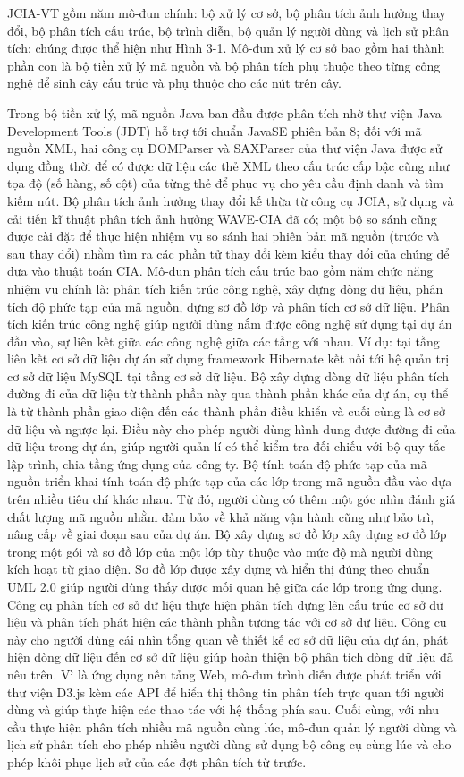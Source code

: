 \documentclass[12pt]{report}
\begin{document}
JCIA-VT gồm năm mô-đun chính: bộ xử lý cơ sở, bộ phân tích ảnh hưởng thay đổi, bộ phân tích cấu trúc, bộ trình diễn, bộ quản lý người dùng và lịch sử phân tích; chúng được thể hiện như Hình 3-1. Mô-đun xử lý cơ sở bao gồm hai thành phần con là bộ tiền xử lý mã nguồn và bộ phân tích phụ thuộc theo từng công nghệ để sinh cây cấu trúc và phụ thuộc cho các nút trên cây.

Trong bộ tiền xử lý, mã nguồn Java ban đầu được phân tích nhờ thư viện Java Development Tools (JDT)  hỗ trợ tới chuẩn JavaSE phiên bản 8; đối với mã nguồn XML, hai công cụ DOMParser và SAXParser của thư viện Java được sử dụng đồng thời để có được dữ liệu các thẻ XML theo cấu trúc cấp bậc cũng như tọa độ (số hàng, số cột) của từng thẻ để phục vụ cho yêu cầu định danh và tìm kiếm nút. Bộ phân tích ảnh hưởng thay đổi kế thừa từ công cụ JCIA, sử dụng và cải tiến kĩ thuật phân tích ảnh hưởng WAVE-CIA đã có; một bộ so sánh cũng được cài đặt để thực hiện nhiệm vụ so sánh hai phiên bản mã nguồn (trước và sau thay đổi) nhằm tìm ra các phần tử thay đổi kèm kiểu thay đổi của chúng để đưa vào thuật toán CIA. Mô-đun phân tích cấu trúc bao gồm năm chức năng nhiệm vụ chính là: phân tích kiến trúc công nghệ, xây dựng dòng dữ liệu, phân tích độ phức tạp của mã nguồn, dựng sơ đồ lớp và phân tích cơ sở dữ liệu. Phân tích kiến trúc công nghệ giúp người dùng nắm được công nghệ sử dụng tại dự án đầu vào, sự liên kết giữa các công nghệ giữa các tầng với nhau. Ví dụ: tại tầng liên kết cơ sở dữ liệu dự án sử dụng framework Hibernate kết nối tới hệ quản trị cơ sở dữ liệu MySQL tại tầng cơ sở dữ liệu. Bộ xây dựng dòng dữ liệu phân tích đường đi của dữ liệu từ thành phần này qua thành phần khác của dự án, cụ thể là từ thành phần giao diện đến các thành phần điều khiển và cuối cùng là cơ sở dữ liệu và ngược lại. Điều này cho phép người dùng hình dung được đường đi của dữ liệu trong dự án, giúp người quản lí có thể kiểm tra đối chiếu với bộ quy tắc lập trình, chia tầng ứng dụng của công ty. Bộ tính toán độ phức tạp của mã nguồn triển khai tính toán độ phức tạp của các lớp trong mã nguồn đầu vào dựa trên nhiều tiêu chí khác nhau. Từ đó, người dùng có thêm một góc nhìn đánh giá chất lượng mã nguồn nhằm đảm bảo về khả năng vận hành cũng như bảo trì, nâng cấp về giai đoạn sau của dự án. Bộ xây dựng sơ đồ lớp xây dựng sơ đồ lớp trong một gói và sơ đồ lớp của một lớp tùy thuộc vào mức độ mà người dùng kích hoạt từ giao diện. Sơ đồ lớp được xây dựng và hiển thị đúng theo chuẩn UML 2.0 giúp người dùng thấy được mối quan hệ giữa các lớp trong ứng dụng. Công cụ phân tích cơ sở dữ liệu thực hiện phân tích dựng lên cấu trúc cơ sở dữ liệu và phân tích phát hiện các thành phần tương tác với cơ sở dữ liệu. Công cụ này cho người dùng cái nhìn tổng quan về thiết kế cơ sở dữ liệu của dự án, phát hiện dòng dữ liệu đến cơ sở dữ liệu giúp hoàn thiện bộ phân tích dòng dữ liệu đã nêu trên. Vì là ứng dụng nền tảng Web, mô-đun trình diễn được phát triển với thư viện D3.js  kèm các API để hiển thị thông tin phân tích trực quan tới người dùng và giúp thực hiện các thao tác với hệ thống phía sau. Cuối cùng, với nhu cầu thực hiện phân tích nhiều mã nguồn cùng lúc, mô-đun quản lý người dùng và lịch sử phân tích cho phép nhiều người dùng sử dụng bộ công cụ cùng lúc và cho phép khôi phục lịch sử của các đợt phân tích từ trước.
\end{document}
